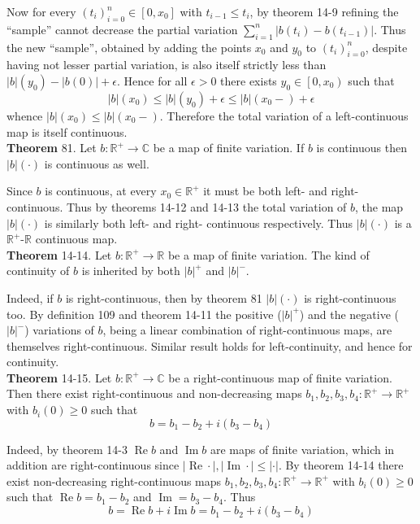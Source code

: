 \documentclass[a4paper]{article}
\newcommand{\clo}[1]{\left [ #1 \right ]}
\newcommand{\clop}[1]{\left [ #1 \right )}
\newcommand{\brac}[1]{\left ( #1 \right )}
\newcommand{\abs}[1]{\left | #1 \right |}
\newcommand{\Real}{\mathbb{R}}
\newcommand{\Cplx}{\mathbb{C}}
\newcommand{\re}{\operatorname{Re}\nolimits}
\newcommand{\im}{\operatorname{Im}\nolimits}
\begin{document}
Now for every $\brac{t_i}_{i=0}^n\in\clo{0,x_0}$ with $t_{i-1}\leq t_i$, by theorem 14-9 refining the ``sample'' cannot decrease the partial variation $\sum_{i=1}^n \abs{b\brac{t_i}-b\brac{t_{i-1}}}$. Thus the new ``sample'', obtained by adding the points $x_0$ and $y_0$ to $\brac{t_i}_{i=0}^n$, despite having not lesser partial variation, is also itself strictly less than $\abs{b}\brac{y_0}-\abs{b\brac{0}}+\epsilon$. Hence for all $\epsilon>0$ there exists  $y_0\in\clop{0,x_0}$ such that \[\abs{b}\brac{x_0}\leq \abs{b}\brac{y_0}+\epsilon\leq \abs{b}\brac{x_0-}+\epsilon\] whence $\abs{b}\brac{x_0}\leq \abs{b}\brac{x_0-}$. Therefore the total variation of a left-continuous map is itself continuous.\\

\label{thm:finite_tot_var_cont}\noindent\textbf{Theorem} 81.
Let $b:\Real^+\to\Cplx$ be a map of finite variation. If $b$ is continuous then $\abs{b}\brac{\cdot}$ is continuous as well.

Since $b$ is continuous, at every $x_0\in \Real^+$ it must be both left- and right- continuous. Thus by theorems 14-12 and 14-13 the total variation of $b$, the map $\abs{b}\brac{\cdot}$ is similarly both left- and right- continuous respectively. Thus $\abs{b}\brac{\cdot}$ is a $\Real^+$-$\Real$ continuous map.\\

\label{thm:tot_var_cont_real_decomp}\noindent\textbf{Theorem} 14-14.
Let $b:\Real^+\to\Real$ be a map of finite variation. The kind of continuity of $b$ is inherited by both $\abs{b}^+$ and $\abs{b}^-$.

Indeed, if $b$ is right-continuous, then by theorem 81 $\abs{b}\brac{\cdot}$ is right-continuous too. By definition 109 and theorem 14-11 the positive ($\abs{b}^+$) and the negative ($\abs{b}^-$) variations of $b$, being a linear combination of right-continuous maps, are themselves right-continuous. Similar result holds for left-continuity, and hence for continuity.\\

\label{thm:cplx_tot_var_cont_cplx_decomp}\noindent\textbf{Theorem} 14-15.
Let $b:\Real^+\to\Cplx$ be a right-continuous map of finite variation. Then there exist right-continuous and non-decreasing maps $b_1,b_2,b_3,b_4:\Real^+\to\Real^+$ with $b_i\brac{0}\geq 0$ such that \[b=b_1-b_2 + i\brac{b_3-b_4}\]

Indeed, by theorem 14-3 $\re b$ and $\im b$ are maps of finite variation, which in addition are right-continuous since $\abs{\re \cdot},\abs{\im \cdot}\leq \abs{\cdot}$. By theorem 14-14 there exist non-decreasing right-continuous maps $b_1,b_2,b_3,b_4:\Real^+\to \Real^+$ with $b_i\brac{0}\geq 0$ such that $\re b=b_1-b_2$ and $\im =b_3-b_4$. Thus \[b=\re b + i \im b = b_1-b_2+i\brac{b_3-b_4}\]
\end{document}
